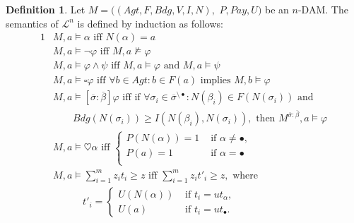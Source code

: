 \documentclass[letterpaper]{article} %
\theoremstyle{definition}
\newtheorem{definition}{Definition}
\newcommand{\Pay}{\mathit{Pay}}
\begin{document}
\begin{definition}
Let $M = ((Agt, F, Bdg, V, I, N),$ $P, \Pay, U)$ be an $n$-DAM. The semantics of $\mathcal{L}^n$  is defined by induction as follows: 
    \begin{alignat*}{1}
        &M, a \models \alpha  \text{ iff }  N(\alpha) = a\\
        &M, a \models \lnot \varphi  \text{ iff }  M, a \not \models \varphi\\
        &M, a \models\varphi \land \psi  \text{ iff }  M, a \models \varphi \text{ and } M, a \models \psi\\
        &M, a \models \square \varphi  \text{ iff }  \forall b \in Agt: b \in F(a) \text{ implies } M, b \models \varphi\\
&M, a \models [\overline{\sigma}:\overline{\beta}] \varphi  \text{ iff }  \text{if }  \forall \sigma_i \in \overline{\sigma}^{\setminus \bullet}: %
        N(\beta_i) \in F(N(\sigma_i)) \text{ and }\\ 
        &\quad \quad Bdg(N(\sigma_i)) \geqslant I(N(\beta_i),N(\sigma_i)), \text{ then } M^{\overline{\sigma}:\overline{\beta}},a \models \varphi\\
        &M,a \models \heartsuit \alpha  \text{ iff }  
        \begin{cases}
        P(N(\alpha)) = 1 &\text{ if } \alpha \neq \bullet,\\
        P(a) = 1 &\text{ if } \alpha = \bullet\\
        \end{cases}\\
        &M,a \models \sum_{i = 1}^m z_i t_i  \geqslant z  \text{ iff }  \sum_{i = 1}^m z_i t'_i \geqslant z, \text{ where } \\
        &\qquad \quad t'_i =
    \begin{cases}
        U(N(\alpha)) &\text{ if } t_i = ut_\alpha,\\
         U(a) &\text{ if } t_i = ut_{\bullet}.
    \end{cases}
\end{alignat*}     

\end{definition}
\end{document}
